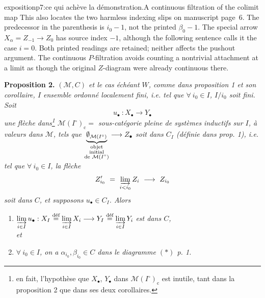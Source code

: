 \begin{dcomment}{exposition}{p7:ce qui achève la démonstration.}{A continuous filtration of the colimit map}
This also locates the two harmless indexing slips on manuscript page~6. The predecessor in the parenthesis is $i_0-1$, not the printed $\beta_0-1$. The special arrow $X_\alpha=Z_{-1}\to Z_0$ has source index $-1$, although the following sentence calls it the case $i=0$. Both printed readings are retained; neither affects the pushout argument. The continuous $P$-filtration avoids counting a nontrivial attachment at a limit as though the original $Z$-diagram were already continuous there.
\end{dcomment}


\textbf{Proposition 2.} \textit{$(\mathcal{M}, C)$ et le cas échéant $W$, comme dans proposition 1 et son corollaire, $I$ ensemble ordonné localement fini, i.e. tel que $\forall\ i_0 \in I$, $I/i_0$ soit fini. Soit}
\[
u_{\bullet}\ : X_{\bullet} \longrightarrow Y_{\bullet}
\]
\textit{une flèche dans\footnote{en fait, l'hypothèse que $X_{\bullet}$, $Y_{\bullet}$ dans $\mathcal{M}(I^{\circ})_{\mathrm{c}}$ est inutile, tant dans la proposition 2 que dans ses deux corollaires.} $\mathcal{M}(I^{\circ})_{\mathrm{c}} =$ sous-catégorie pleine de systèmes inductifs sur $I$, à valeurs dans $\mathcal{M}$, tels que $\underbrace{\emptyset_{\mathcal{M}(I^{\circ})}}_{\substack{\textup{objet}\\ \textup{initial}\\ \textup{de } \mathcal{M}(I^{\circ})}} \longrightarrow Z_{\bullet}$ soit dans $C_I$ (définie dans prop. 1), i.e. tel que $\forall\ i_0 \in I$, la flèche}
\[
Z'_{i_0} \ = \ \varinjlim_{i < i_0} Z_i \ \longrightarrow \ Z_{i_0}
\]
\textit{soit dans $C$, et supposons $u_{\bullet} \in C_I$. Alors}
\begin{enumerate}
\item[a)] $\varinjlim\limits_{i \in I} u_{\bullet} : X_I \defeq \varinjlim\limits_{i \in I} X_i \longrightarrow Y_I \defeq \varinjlim\limits_{i \in I} Y_i$ \textit{est dans $C$,}
\\
\textit{et}
\item[b)] \textit{$\forall\ i_0 \in I$, on a $\alpha_{i_0}, \beta_{i_0} \in C$ dans le diagramme $(*)$ p. 1.}
\end{enumerate}

